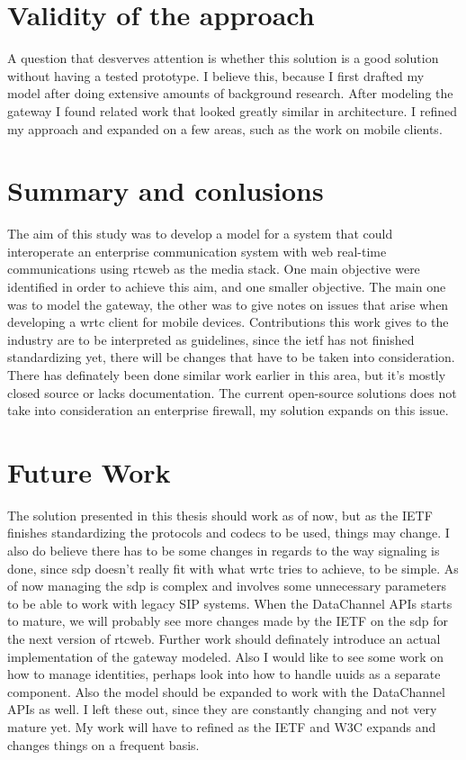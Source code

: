 \section{Validity of the approach}
A question that desverves attention is whether this solution is a good solution without having a tested prototype. I believe this, because I first drafted my model after doing extensive amounts of background research. After modeling the gateway I found related work that looked greatly similar in architecture. I refined my approach and expanded on a few areas, such as the work on mobile clients.

\section{Summary and conlusions}
The aim of this study was to develop a model for a system that could interoperate an enterprise communication system with web real-time communications using \gls{rtcweb} as the media stack. One main objective were identified in order to achieve this aim, and one smaller objective. The main one was to model the gateway, the other was to give notes on issues that arise when developing a \gls{wrtc} client for mobile devices. Contributions this work gives to the industry are to be interpreted as guidelines, since the \gls{ietf} has not finished standardizing yet, there will be changes that have to be taken into consideration. There has definately been done similar work earlier in this area, but it's mostly closed source or lacks documentation. The current open-source solutions does not take into consideration an enterprise firewall, my solution expands on this issue.

\section{Future Work}
The solution presented in this thesis should work as of now, but as the IETF finishes standardizing the protocols and codecs to be used, things may change. I also do believe there has to be some changes in regards to the way signaling is done, since \gls{sdp} doesn't really fit with what \gls{wrtc} tries to achieve, to be simple. As of now managing the \gls{sdp} is complex and involves some unnecessary parameters to be able to work with legacy SIP systems. When the DataChannel APIs starts to mature, we will probably see more changes made by the IETF on the \gls{sdp} for the next version of \gls{rtcweb}. Further work should definately introduce an actual implementation of the gateway modeled. Also I would like to see some work on how to manage identities, perhaps look into how to handle \gls{uuid}s as a separate component. Also the model should be expanded to work with the DataChannel APIs as well. I left these out, since they are constantly changing and not very mature yet. My work will have to refined as the IETF and W3C expands and changes things on a frequent basis.

